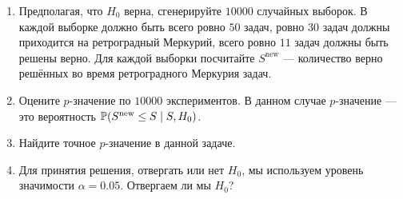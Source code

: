 \begin{enumerate}
\begin{enumerate}
    \item Предполагая, что $H_0$ верна, сгенерируйте $10000$ случайных выборок. 
    В каждой выборке должно быть всего ровно $50$ задач, ровно $30$ задач должны приходится на ретроградный Меркурий,
    всего ровно $11$ задач должны быть решены верно. 
    Для каждой выборки посчитайте $S^{\text{new}}$ — количество верно решённых во время ретроградного Меркурия задач.
    \item Оцените $p$-значение по $10000$ экспериментов. 
    В данном случае $p$-значение — это вероятность $\P(S^{\text{new}} \leq S \mid S, H_0)$.
    \item Найдите точное $p$-значение в данной задаче. 
    \item Для принятия решения, отвергать или нет $H_0$, мы используем уровень значимости $\alpha = 0.05$.
    Отвергаем ли мы $H_0$?
\end{enumerate}

\end{enumerate}

